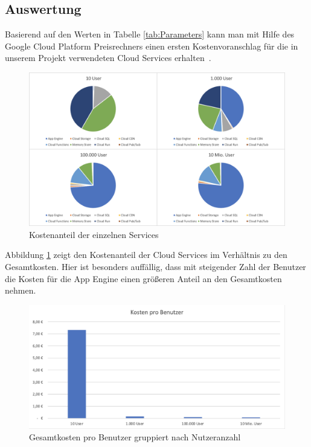 \documentclass{article}
\begin{document}
\subsection{Auswertung}

Basierend auf den Werten in Tabelle \ref{tab:Parameters} kann man mit Hilfe des Google Cloud Platform Preisrechners einen ersten Kostenvoranschlag für die in unserem Projekt verwendeten Cloud Services erhalten~\cite{google-pricing}.

\FloatBarrier

\begin{figure}[H]
\centering
\label{fig:pricingUsers}
\includegraphics[width=\textwidth]{images/pricing-users}
\caption{Kostenanteil der einzelnen Services}
\end{figure}

Abbildung \ref{fig:pricingUsers} zeigt den Kostenanteil der Cloud Services im Verhältnis zu den Gesamtkosten. Hier ist besonders auffällig, dass mit steigender Zahl der Benutzer die Kosten für die App Engine einen größeren Anteil an den Gesamtkosten nehmen.

\FloatBarrier

\begin{figure}[H]
\centering
\label{fig:costPerUser}
\includegraphics[width=\textwidth]{images/cost-per-user}
\caption{Gesamtkosten pro Benutzer gruppiert nach Nutzeranzahl}
\end{figure}
\end{document}
